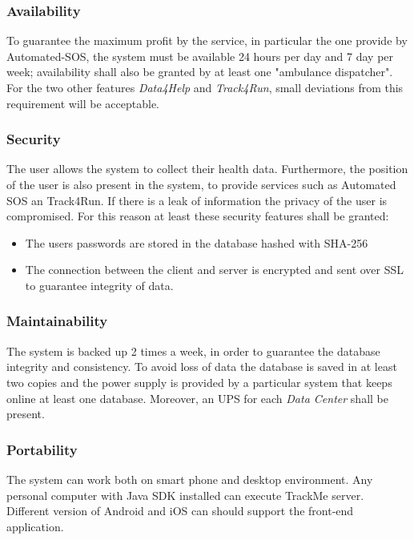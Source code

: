 \documentclass[a4paper]{article}
\begin{document}
        \subsubsection{Availability}
        To guarantee the maximum profit by the service, in particular the one provide by Automated-SOS, the system must be available 24 hours per day and 7 day per week; availability shall also be granted by at least one "ambulance dispatcher". For the two other features \textit{Data4Help} and \textit{Track4Run}, small deviations from this requirement will be acceptable.
        
        \subsubsection{Security}
        The user allows the system to collect their health data. Furthermore, the position of the user is also present in the system, to provide services such as Automated SOS an Track4Run. If there is a leak of information the privacy of the user is compromised. For this reason at least these security features shall be granted:
       
        \begin{itemize}
        \item         The users passwords are stored in the database hashed with SHA-256\item       The  connection between the client and server is encrypted and sent over SSL to guarantee integrity of data. 
        \end{itemize}
        \subsubsection{Maintainability}

        The system is backed up 2 times a  week, in order to guarantee the database integrity and consistency. To avoid loss of data  the database is saved in at least two copies and the power supply is provided by a particular system that keeps online at least one database. Moreover, an UPS for each \textit{Data Center} shall be present.
        \subsubsection{Portability}

        The system can work both on smart phone and desktop environment. Any personal computer with Java SDK installed can execute TrackMe server. Different version of Android and iOS can should support the front-end application.
\end{document}

